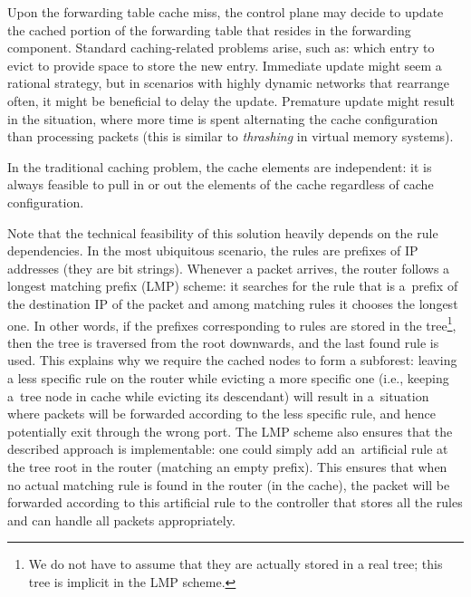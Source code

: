 Upon the forwarding table cache miss, the control plane may decide to update the cached portion of the forwarding table that resides in the forwarding component.
Standard caching-related problems arise, such as: which entry to evict to provide space to store the new entry.
Immediate update might seem a rational strategy, but in scenarios with highly dynamic networks that rearrange often, it might be beneficial to delay the update.
Premature update might result in the situation, where more time is spent alternating the cache configuration than processing packets (this is similar to \emph{thrashing} in virtual memory systems).

In the traditional caching problem, the cache elements are independent: it is always feasible to pull in or out the elements of the cache regardless of cache configuration.

Note that the technical feasibility of this solution heavily depends on the
rule dependencies. In the most ubiquitous scenario, the rules are prefixes of
IP addresses (they are bit strings). Whenever a packet arrives, the router
follows a longest matching prefix (LMP) scheme: it searches for the rule that
is a~prefix of the destination IP of the packet and among matching rules it
chooses the longest one. In other words, if the prefixes corresponding to
rules are stored in the tree\footnote{We do not have to assume that they are
actually stored in a real tree; this tree is implicit in the LMP scheme.},
then the tree is traversed from the root downwards, and the last found rule is
used. This explains why we require the cached nodes to form a subforest:
leaving a less specific rule on the router while evicting a more specific one
(i.e., keeping a~tree node in cache while evicting its descendant) will result
in a~situation where packets will be forwarded according to the less specific
rule, and hence potentially exit through the wrong port. The LMP scheme also
ensures that the described approach is implementable: one could simply add
an~artificial rule at the tree root in the router (matching an empty prefix).
This ensures that when no actual matching rule is found in the router (in the
cache), the packet will be forwarded according to this artificial rule to the
controller that stores all the rules and can handle all packets appropriately.





